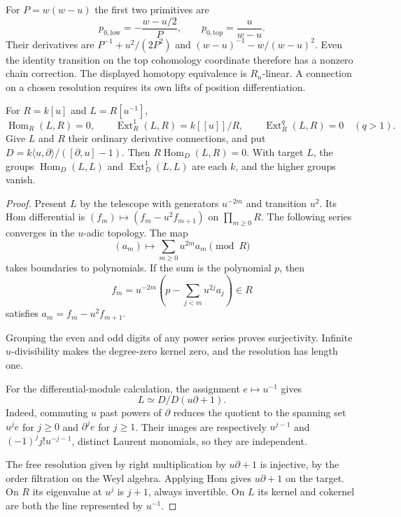 For $P=w(w-u)$ the first two primitives are
\begin{equation}\label{cbc:hc:binary-primitives}
 p_{0,\mathrm{low}}=-\frac{w-u/2}{P},\qquad
 p_{0,\mathrm{top}}=\frac{u}{w-u}.
\end{equation}
Their derivatives are $P^{-1}+u^2/(2P^2)$ and
$(w-u)^{-1}-w/(w-u)^2$. Even the identity transition on
the top cohomology coordinate therefore has a nonzero
chain correction. The displayed homotopy equivalence is
$R_n$-linear. A connection on a chosen resolution requires
its own lifts of position differentiation.

\begin{proposition}\label{cbc:hc:reverse-hom}
For $R=k[u]$ and $L=R[u^{-1}]$,
\[
 \operatorname{Hom}_R(L,R)=0,\qquad
 \operatorname{Ext}^1_R(L,R)=k[[u]]/R,
 \qquad \operatorname{Ext}^{q}_R(L,R)=0\quad(q>1).
\]
Give $L$ and $R$ their ordinary derivative connections, and
put $D=k\langle u,\partial\rangle/([\partial,u]-1)$.
Then $R\operatorname{Hom}_D(L,R)=0$.
With target $L$, the groups $\operatorname{Hom}_D(L,L)$
and $\operatorname{Ext}^1_D(L,L)$ are each $k$, and the
higher groups vanish.
\end{proposition}

\begin{proof}
Present $L$ by the telescope with generators $u^{-2m}$
and transition $u^2$. Its Hom differential is
$(f_m)\mapsto(f_m-u^2f_{m+1})$ on $\prod_{m\geq0}R$.
The following series converges in the $u$-adic topology.
The map
\[
 (a_m)\longmapsto\sum_{m\geq0}u^{2m}a_m\pmod R
\]
takes boundaries to polynomials. If the sum is the
polynomial $p$, then
\[
 f_m=u^{-2m}\left(p-\sum_{j<m}u^{2j}a_j\right)\in R
\]
satisfies $a_m=f_m-u^2f_{m+1}$.

Grouping the even and odd
digits of any power series proves surjectivity.
Infinite $u$-divisibility makes the degree-zero kernel
zero, and the resolution has length one.

For the differential-module calculation, the assignment
$e\mapsto u^{-1}$ gives
\begin{equation}\label{cbc:hc:localization-presentation}
 L\simeq D/D(u\partial+1).
\end{equation}
Indeed, commuting $u$ past powers of $\partial$ reduces the
quotient to the spanning set $u^je$ for $j\geq0$ and
$\partial^je$ for $j\geq1$. Their images are respectively
$u^{j-1}$ and $(-1)^jj!u^{-j-1}$, distinct Laurent
monomials, so they are independent.

The free resolution
given by right multiplication by $u\partial+1$ is
injective, by the order filtration on the Weyl algebra.
Applying Hom gives $u\partial+1$ on the target. On $R$
its eigenvalue at $u^j$ is $j+1$, always invertible.
On $L$ its kernel and cokernel are both the line represented
by $u^{-1}$.
\end{proof}

